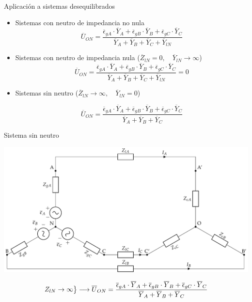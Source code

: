 \documentclass[aspectratio=169, usenames,svgnames,dvipsnames]{beamer}
\begin{document}
\begin{frame}[label={sec:org91a5a13}]{Aplicación a sistemas desequilibrados}
\begin{itemize}
\item Sistemas con neutro de impedancia no nula
\[
  \overline{U}_{ON} = \frac{\overline{\epsilon}_{gA} \cdot \overline{Y}_A + \overline{\epsilon}_{gB} \cdot \overline{Y}_B + \overline{\epsilon}_{gC} \cdot \overline{Y}_C}{\overline{Y}_A + \overline{Y}_B + \overline{Y}_C + \overline{Y}_{lN}}
\]

\item Sistemas con neutro de impedancia nula (\(\overline{Z}_{lN} = 0,  \quad \overline{Y}_{lN} \to \infty\))
\[
  \overline{U}_{ON} = \frac{\overline{\epsilon}_{gA} \cdot \overline{Y}_A + \overline{\epsilon}_{gB} \cdot \overline{Y}_B + \overline{\epsilon}_{gC} \cdot \overline{Y}_C}{\overline{Y}_A + \overline{Y}_B + \overline{Y}_C + \overline{Y}_{lN}} = 0
\]

\item Sistemas sin neutro (\(\overline{Z}_{lN} \to \infty, \quad \overline{Y}_{lN} = 0\))

\[
  \overline{U}_{ON} = \frac{\overline{\epsilon}_{gA} \cdot \overline{Y}_A + \overline{\epsilon}_{gB} \cdot \overline{Y}_B + \overline{\epsilon}_{gC} \cdot \overline{Y}_C}{\overline{Y}_A + \overline{Y}_B + \overline{Y}_C}
\]
\end{itemize}
\end{frame}

\begin{frame}[label={sec:orge611b3b}]{Sistema sin neutro}
\begin{center}
\includegraphics[height=0.7\textheight]{../figs/CircuitoTrifasicaGeneralizado_sinNeutro.pdf}
\end{center}
\[
  \begin{rcases}
    Z_{lN} \to \infty
  \end{rcases}
  \longrightarrow%
  \overline{U}_{ON} = \frac{\overline{\epsilon}_{gA} \cdot \overline{Y}_A + \overline{\epsilon}_{gB} \cdot \overline{Y}_B + \overline{\epsilon}_{gC} \cdot \overline{Y}_C}{\overline{Y}_A + \overline{Y}_B + \overline{Y}_C}
\]
\end{frame}
\end{document}
